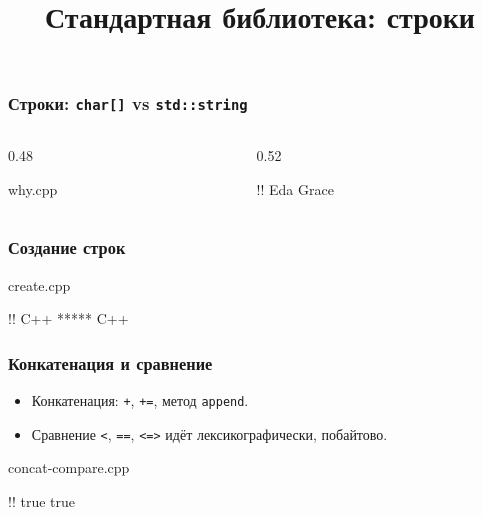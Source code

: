 \documentclass[compress, 8pt, aspectratio=169]{beamer}
\title{Стандартная библиотека: строки}
\begin{document}
  \frame[plain]{\titlepage}

  \begin{frame}[fragile]

    \frametitle{Строки: \texttt{char[]} vs \texttt{std::string}}

    \begin{columns}[T]

      \begin{column}{0.48\textwidth}

            {why.cpp}

      \end{column}

      \begin{column}{0.52\textwidth}

        \begin{terminalwindow}
!!
Eda
Grace
        \end{terminalwindow}

      \end{column}

    \end{columns}

  \end{frame}

  \begin{frame}[fragile]

    \frametitle{Создание строк}

        {create.cpp}

    \begin{terminalwindow}
!!
C++ ***** C++
    \end{terminalwindow}

  \end{frame}

  \begin{frame}[fragile]

    \frametitle{Конкатенация и сравнение}

    \begin{itemize}

      \item Конкатенация: \texttt{+}, \texttt{+=}, метод \texttt{append}.

      \item Сравнение \texttt{<}, \texttt{==}, \texttt{<=>}
        идёт лексикографически, побайтово.

    \end{itemize}

        {concat-compare.cpp}

    \begin{terminalwindow}
!!
true true
    \end{terminalwindow}

  \end{frame}
\end{document}
